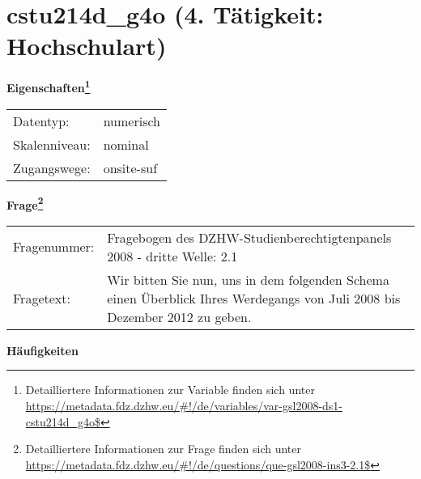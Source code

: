 
    \setcounter{footnote}{0}

    \vspace*{-1.8cm}
	\section{cstu214d\_g4o (4. Tätigkeit: Hochschulart)}
	\label{section:cstu214d_g4o}



    \vspace*{0.5cm}
    \noindent\textbf{Eigenschaften\footnote{Detailliertere Informationen zur Variable finden sich unter
		\url{https://metadata.fdz.dzhw.eu/\#!/de/variables/var-gsl2008-ds1-cstu214d_g4o$}}}\\
	\begin{tabularx}{\hsize}{@{}lX}
	Datentyp: & numerisch \\
	Skalenniveau: & nominal \\
	Zugangswege: &
	  onsite-suf
 \\
    \end{tabularx}



				\vspace*{0.5cm}
                \noindent\textbf{Frage\footnote{Detailliertere Informationen zur Frage finden sich unter
		              \url{https://metadata.fdz.dzhw.eu/\#!/de/questions/que-gsl2008-ins3-2.1$}}}\\
				\begin{tabularx}{\hsize}{@{}lX}
					Fragenummer: &
					  Fragebogen des DZHW-Studienberechtigtenpanels 2008 - dritte Welle:
					  2.1
 \\
					Fragetext: & Wir bitten Sie nun, uns in dem folgenden Schema einen Überblick Ihres Werdegangs von Juli 2008 bis Dezember 2012 zu geben. \\
				\end{tabularx}





        		\vspace*{0.5cm}
                \noindent\textbf{Häufigkeiten}

